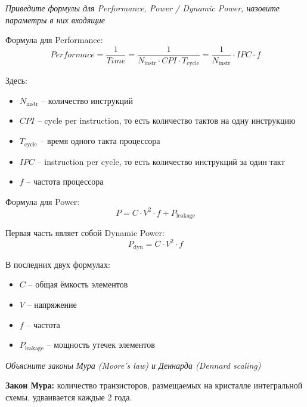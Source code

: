 


	
	\newpage
	
	\tableofcontents
	\newpage
	

	\textit{Приведите формулы для Performance, Power / Dynamic Power, назовите параметры в них входящие}

	Формула для Performance:
	\begin{equation*}
		Performace = \frac{1}{Time} = \frac{1}{N_\text{instr} \cdot CPI \cdot T_\text{cycle}} = \frac{1}{N_\text{instr}} \cdot IPC \cdot f
	\end{equation*}
	
	Здесь:
	\begin{itemize}
		\item $N_\text{instr}$ -- количество инструкций
		\item $CPI$ -- cycle per instruction, то есть количество тактов на одну инструкцию
		\item $T_\text{cycle}$ -- время одного такта процессора
		\item $IPC$ -- instruction per cycle, то есть количество инструкций за один такт
		\item $f$ -- частота процессора
	\end{itemize}
	
	Формула для Power:
	\begin{equation*}
		P = C \cdot V^2 \cdot f + P_\text{leakage}
	\end{equation*}
	
	Первая часть являет собой Dynamic Power:
	\begin{equation*}
		P_\text{dyn} = C \cdot V^2 \cdot f
	\end{equation*}
	
	В последних двух формулах:
	\begin{itemize}
		\item $C$ -- общая ёмкость элементов
		\item $V$ -- напряжение
		\item $f$ -- частота
		\item $P_\text{leakage}$ -- мощность утечек элементов
	\end{itemize}
	
	\textit{Объясните законы Мура (Moore’s law) и Деннарда (Dennard scaling)}
	
	\textbf{Закон Мура:} количество транзисторов, размещаемых на кристалле интегральной схемы, удваивается каждые 2 года.
	
